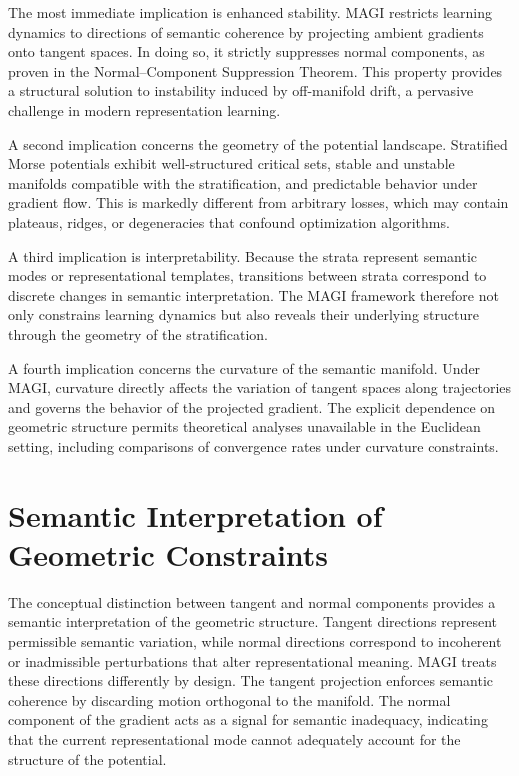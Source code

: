 \documentclass[12pt]{article}
\begin{document}
The most immediate implication is enhanced stability. MAGI restricts learning dynamics to directions of semantic coherence by projecting ambient gradients onto tangent spaces. In doing so, it strictly suppresses normal components, as proven in the Normal–Component Suppression Theorem. This property provides a structural solution to instability induced by off-manifold drift, a pervasive challenge in modern representation learning.

A second implication concerns the geometry of the potential landscape. Stratified Morse potentials exhibit well-structured critical sets, stable and unstable manifolds compatible with the stratification, and predictable behavior under gradient flow. This is markedly different from arbitrary losses, which may contain plateaus, ridges, or degeneracies that confound optimization algorithms.

A third implication is interpretability. Because the strata represent semantic modes or representational templates, transitions between strata correspond to discrete changes in semantic interpretation. The MAGI framework therefore not only constrains learning dynamics but also reveals their underlying structure through the geometry of the stratification.

A fourth implication concerns the curvature of the semantic manifold. Under MAGI, curvature directly affects the variation of tangent spaces along trajectories and governs the behavior of the projected gradient. The explicit dependence on geometric structure permits theoretical analyses unavailable in the Euclidean setting, including comparisons of convergence rates under curvature constraints.


\section{Semantic Interpretation of Geometric Constraints}

The conceptual distinction between tangent and normal components provides a semantic interpretation of the geometric structure. Tangent directions represent permissible semantic variation, while normal directions correspond to incoherent or inadmissible perturbations that alter representational meaning. MAGI treats these directions differently by design. The tangent projection enforces semantic coherence by discarding motion orthogonal to the manifold. The normal component of the gradient acts as a signal for semantic inadequacy, indicating that the current representational mode cannot adequately account for the structure of the potential.
\end{document}
